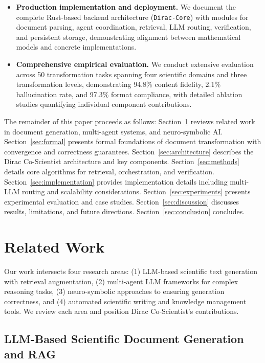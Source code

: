 \documentclass{ieeeaccess}
\begin{document}
\begin{itemize}
\item \textbf{Production implementation and deployment.} We document the complete Rust-based backend architecture (\texttt{Dirac-Core}) with modules for document parsing, agent coordination, retrieval, LLM routing, verification, and persistent storage, demonstrating alignment between mathematical models and concrete implementations.

\item \textbf{Comprehensive empirical evaluation.} We conduct extensive evaluation across 50 transformation tasks spanning four scientific domains and three transformation levels, demonstrating 94.8\% content fidelity, 2.1\% hallucination rate, and 97.3\% format compliance, with detailed ablation studies quantifying individual component contributions.
\end{itemize}

The remainder of this paper proceeds as follows: Section~\ref{sec:related} reviews related work in document generation, multi-agent systems, and neuro-symbolic AI. Section~\ref{sec:formal} presents formal foundations of document transformation with convergence and correctness guarantees. Section~\ref{sec:architecture} describes the Dirac Co-Scientist architecture and key components. Section~\ref{sec:methods} details core algorithms for retrieval, orchestration, and verification. Section~\ref{sec:implementation} provides implementation details including multi-LLM routing and scalability considerations. Section~\ref{sec:experiments} presents experimental evaluation and case studies. Section~\ref{sec:discussion} discusses results, limitations, and future directions. Section~\ref{sec:conclusion} concludes.

\section{Related Work}\label{sec:related}

Our work intersects four research areas: (1) LLM-based scientific text generation with retrieval augmentation, (2) multi-agent LLM frameworks for complex reasoning tasks, (3) neuro-symbolic approaches to ensuring generation correctness, and (4) automated scientific writing and knowledge management tools. We review each area and position Dirac Co-Scientist's contributions.

\subsection{LLM-Based Scientific Document Generation and RAG}
\end{document}
